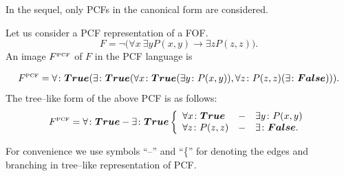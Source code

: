 \documentclass[runningheads,a4paper]{llncs}
\begin{document}
In the sequel, only PCFs in the canonical form are considered.



\begin{example}
Let us consider a PCF representation of a FOF.
$$F= \neg\bigl(\forall x\:\exists y P(x,y)\rightarrow \exists z P(z,z)\bigr).$$
An image $F^{\text{\tiny{PCF}}}$ of $F$ in the PCF language is

$$F^{\text{\tiny{PCF}}} = \forall\colon \boldsymbol{True}(\exists\colon\boldsymbol{True}(\forall x\colon\boldsymbol{True}(\exists y\colon P(x,y)), \forall z\colon P(z,z)(\exists\colon\boldsymbol{False}))).$$
The tree--like form of the above PCF is as follows:
$$F^{\text{\tiny{PCF}}} = \forall\colon \boldsymbol{True}-\exists\colon\boldsymbol{True} \left\{
\begin{array}{lcl}
 \forall x\colon\boldsymbol{True} & - & \exists y\colon P(x,y) \\
 \forall z\colon P(z,z) & - & \exists\colon\boldsymbol{False}.
\end{array}
\right.$$
\end{example}
For convenience we use symbols ``--'' and ``\{'' for denoting the edges and branching in tree--like representation of PCF.
\end{document}
